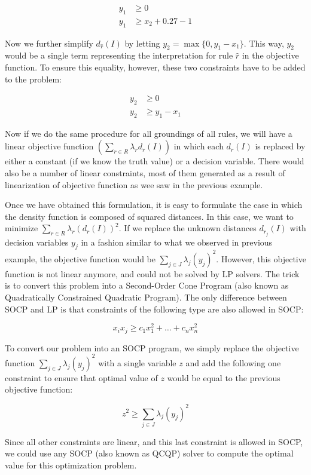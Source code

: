 \documentclass[12pt,a4paper]{article}
\begin{document}
\begin{align*}
y_1 & \geq 0 \\
y_1 & \geq x_2 + 0.27 -1
\end{align*}

Now we further simplify $d_{\hat{r}} (I)$ by letting $y_2 = \max \{ 0, y_1 - x_1 \}$. This way, $y_2$ would be a single term representing the interpretation for rule $\hat{r}$ in the objective function. To ensure this equality, however, these two constraints have to be added to the problem:

\begin{align*}
y_2 & \geq 0 \\
y_2 & \geq y_1 - x_1
\end{align*}

Now if we do the same procedure for all groundings of all rules, we will have a linear objective function $\left( \sum_{r \in R} \lambda_r d_r (I) \right)$ in which each $d_r (I)$ is replaced by either a constant (if we know the truth value) or a decision variable. There would also be a number of linear constraints, most of them generated as a result of linearization of objective function as wee saw in the previous example. 

Once we have obtained this formulation, it is easy to formulate the case in which the density function is composed of squared distances. In this case, we want to minimize $\sum_{r \in R} \lambda_r \left(d_r(I)\right)^2$. If we replace the unknown distances $d_{r_j} (I)$ with decision variables $y_j$ in a fashion similar to what we observed in previous example, the objective function would be $\sum_{j \in J} \lambda_j (y_j)^2$. However, this objective function is not linear anymore, and could not be solved by LP solvers. The trick is to convert this problem into a Second-Order Cone Program (also known as Quadratically Constrained Quadratic Program). The only difference between SOCP and LP is that constraints of the following type are also allowed in SOCP:

\begin{equation*}
x_i x_j \geq c_1 x_1^2 + \dots + c_n x_n^2
\end{equation*}

To convert our problem into an SOCP program, we simply replace the objective function $\sum_{j \in J} \lambda_j (y_j)^2$ with a single variable $z$ and add the following one constraint to ensure that optimal value of $z$ would be equal to the previous objective function:

\begin{equation*}
z^2 \geq \sum_{j \in J} \lambda_j (y_j)^2
\end{equation*}

Since all other constraints are linear, and this last constraint is allowed in SOCP, we could use any SOCP (also known as QCQP) solver to compute the optimal value for this optimization problem. 
\end{document}
